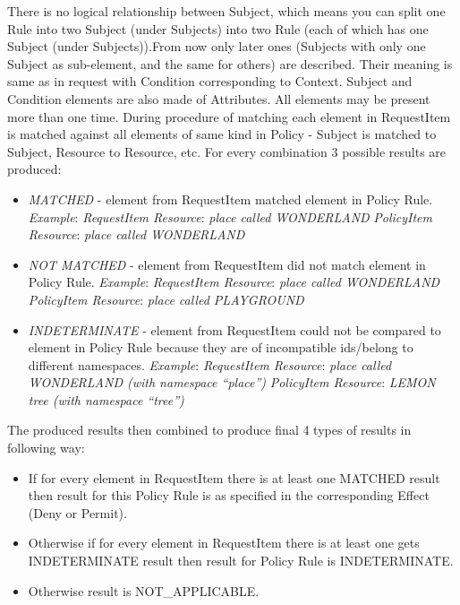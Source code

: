 \documentclass{article}                            %
\begin{document}
There is no logical relationship between Subject, which means you can split one Rule into two Subject (under Subjects) into two Rule (each of which has one Subject (under Subjects)).From now only later ones (Subjects with only one Subject as sub-element, and the same for others) are described. Their meaning is same as in request with Condition corresponding to Context. Subject and Condition elements are also made of Attributes. All elements may be present more than one time. During procedure of matching each element in RequestItem is matched against all elements of same kind in Policy - Subject is matched to Subject, Resource to Resource, etc. For every combination 3 possible results are produced:

    \begin{itemize}
        \item \emph{MATCHED} - element from RequestItem matched element in Policy Rule. 
            \emph{Example}:
            \emph{RequestItem Resource}: \textit{place called WONDERLAND}
            \emph{PolicyItem Resource}: \textit{place called WONDERLAND}
        \item \emph{NOT MATCHED} - element from RequestItem did not match element in Policy Rule. 
            \emph{Example}:
            \emph{RequestItem Resource}: \textit{place called WONDERLAND}
            \emph{PolicyItem Resource}: \textit{place called PLAYGROUND}
        \item \emph{INDETERMINATE} - element from RequestItem could not be compared to element in Policy  Rule because they are of incompatible ids/belong to different namespaces. 
            \emph{Example}:
            \emph{RequestItem Resource}: \textit{place called WONDERLAND (with namespace ``place'')}
            \emph{PolicyItem Resource}: \textit{LEMON tree (with namespace ``tree'')}
    \end{itemize}

The produced results then combined to produce final 4 types of results in following way:

    \begin{itemize}
        \item If for every element in RequestItem there is at least one MATCHED result then result for this Policy Rule is as specified in the corresponding Effect (Deny or Permit).
        \item Otherwise if for every element in RequestItem there is at least one gets INDETERMINATE result then result for Policy Rule is INDETERMINATE.
        \item Otherwise result is NOT\_APPLICABLE.
    \end{itemize}
\end{document}
